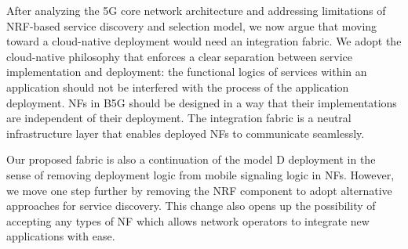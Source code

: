 \documentclass[conference]{IEEEtran}
\begin{document}
After analyzing the 5G core network architecture and addressing limitations of
NRF-based service discovery and selection model, we now argue that moving
toward a cloud-native deployment would need an integration fabric. We adopt the
cloud-native philosophy that enforces a clear separation between service
implementation  and deployment: the functional logics of services within an
application should not be interfered with the process of the application
deployment. NFs in B5G should be designed in a way that their implementations
are independent of their deployment. The integration fabric is a neutral
infrastructure layer that enables deployed NFs to communicate seamlessly.

Our proposed fabric is also a continuation of the model D deployment in the
sense of removing deployment logic from mobile signaling logic in NFs. However,
we move one step further by removing the NRF component to adopt alternative
approaches for service discovery. This change also opens up the possibility of
accepting any types of NF which allows network operators to integrate new
applications with ease.
\end{document}
